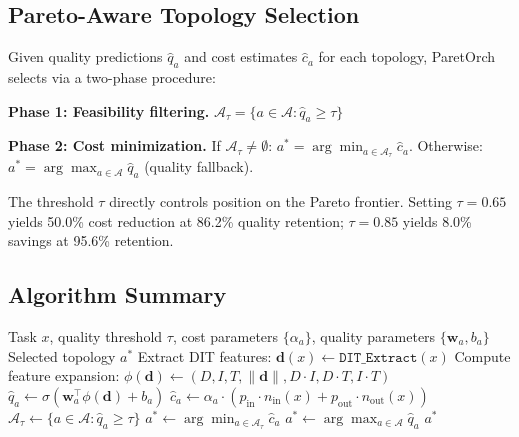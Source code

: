 \documentclass{article}
\begin{document}
\subsection{Pareto-Aware Topology Selection}

Given quality predictions $\hat{q}_a$ and cost estimates $\hat{c}_a$ for each topology, ParetOrch selects via a two-phase procedure:

\textbf{Phase 1: Feasibility filtering.} $\mathcal{A}_{\tau} = \{a \in \mathcal{A} : \hat{q}_a \geq \tau\}$

\textbf{Phase 2: Cost minimization.} If $\mathcal{A}_{\tau} \neq \emptyset$: $a^{*} = \arg\min_{a \in \mathcal{A}_{\tau}} \hat{c}_a$. Otherwise: $a^{*} = \arg\max_{a \in \mathcal{A}} \hat{q}_a$ (quality fallback).

The threshold $\tau$ directly controls position on the Pareto frontier. Setting $\tau = 0.65$ yields 50.0\% cost reduction at 86.2\% quality retention; $\tau = 0.85$ yields 8.0\% savings at 95.6\% retention.

\subsection{Algorithm Summary}

\begin{algorithm}[t]
\caption{ParetOrch Topology Routing}
\label{alg:paretorch}
\begin{algorithmic}[1]
\REQUIRE Task $x$, quality threshold $\tau$, cost parameters $\{\alpha_a\}$, quality parameters $\{\mathbf{w}_a, b_a\}$
\ENSURE Selected topology $a^{*}$
\STATE Extract DIT features: $\mathbf{d}(x) \leftarrow \texttt{DIT\_Extract}(x)$
\STATE Compute feature expansion: $\phi(\mathbf{d}) \leftarrow (D, I, T, \|\mathbf{d}\|, D \cdot I, D \cdot T, I \cdot T)$
\STATE $\hat{q}_a \leftarrow \sigma(\mathbf{w}_a^{\top} \phi(\mathbf{d}) + b_a)$ 
\STATE $\hat{c}_a \leftarrow \alpha_a \cdot (p_{\text{in}} \cdot n_{\text{in}}(x) + p_{\text{out}} \cdot n_{\text{out}}(x))$ 
\ENDFOR
\STATE $\mathcal{A}_{\tau} \leftarrow \{a \in \mathcal{A} : \hat{q}_a \geq \tau\}$
\STATE $a^{*} \leftarrow \arg\min_{a \in \mathcal{A}_{\tau}} \hat{c}_a$
\ELSE
\STATE $a^{*} \leftarrow \arg\max_{a \in \mathcal{A}} \hat{q}_a$
\ENDIF
\RETURN $a^{*}$
\end{algorithmic}
\end{algorithm}
\end{document}
